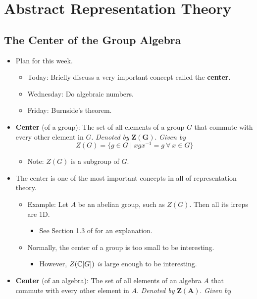 \documentclass[../notes.tex]{subfiles}
\begin{document}
\chapter{Abstract Representation Theory}
\section{The Center of the Group Algebra}
\begin{itemize}
    \item {}Plan for this week.
    \begin{itemize}
        \item Today: Briefly discuss a very important concept called the \textbf{center}.
        \item Wednesday: Do algebraic numbers.
        \item Friday: Burnside's theorem.
    \end{itemize}
    \item \textbf{Center} (of a group): The set of all elements of a group $G$ that commute with every other element in $G$. \emph{Denoted by} $\bm{Z(G)}$. \emph{Given by}
    \begin{equation*}
        Z(G) = \{g\in G\mid xgx^{-1}=g\ \forall\ x\in G\}
    \end{equation*}
    \begin{itemize}
        \item Note: $Z(G)$ is a subgroup of $G$.
    \end{itemize}
    \item The center is one of the most important concepts in all of representation theory.
    \begin{itemize}
        \item Example: Let $A$ be an abelian group, such as $Z(G)$. Then all its irreps are 1D.
        \begin{itemize}
            \item See Section 1.3 of \textcite{bib:FultonHarris} for an explanation.
        \end{itemize}
        \item Normally, the center of a group is too small to be interesting.
        \begin{itemize}
            \item However, $Z(\mathbb{C}[G])$ \emph{is} large enough to be interesting.
        \end{itemize}
    \end{itemize}
    \item \textbf{Center} (of an algebra): The set of all elements of an algebra $A$ that commute with every other element in $A$. \emph{Denoted by} $\bm{Z(A)}$. \emph{Given by}

\end{itemize}
\end{document}
